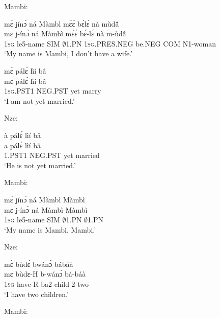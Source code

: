 \noindent Mambi:

\begin{exe} 
\exC\label{92} 
  \glll mɛ̀ jínɔ̀ ná Màmbì mɛ̀ɛ́ bɛ́lɛ́ nà mùdã̂  \\
      mɛ j-ínɔ̀ ná Màmbì mɛ̀ɛ́ bɛ́-lɛ́ nà m-ùdã̂  \\
         1\textsc{sg} le5-name SIM $\emptyset$1.PN 1\textsc{sg}.PRES.NEG be.NEG COM N1-woman   \\
    \trans `My name is Mambi, I don't have a wife.'
\end{exe}

\begin{exe} 
\exC\label{93}
  \glll  mɛ̀ pálɛ́ lìí bâ \\
          mɛ pálɛ́ lìí bâ \\
           1\textsc{sg}.PST1 NEG.PST yet marry \\
    \trans `I am not yet married.'
\end{exe}

\noindent Nze:

\begin{exe} 
\exC\label{94}
  \glll  à pálɛ́ lìí bâ \\
      a pálɛ́ lìí bâ \\
          1.PST1 NEG.PST yet married  \\
    \trans `He is not yet married.'
\end{exe}

\noindent Mambi:

\begin{exe} 
\exC\label{95} 
  \glll mɛ̀ jínɔ̀ ná Màmbì Màmbì  \\
        mɛ j-ínɔ̀ ná Màmbì Màmbì  \\
          1\textsc{sg} le5-name SIM $\emptyset$1.PN $\emptyset$1.PN  \\
    \trans `My name is Mambi, Mambi.'
\end{exe}

\noindent Nze:

\begin{exe} 
\exC\label{96} 
  \glll  mɛ̀ bùdɛ́ bwánɔ̀ bábáà \\
        mɛ bùdɛ-H b-wánɔ̀ bá-báà \\
         1\textsc{sg} have-R ba2-child 2-two   \\
    \trans `I have two children.'
\end{exe}

\noindent Mambi:

